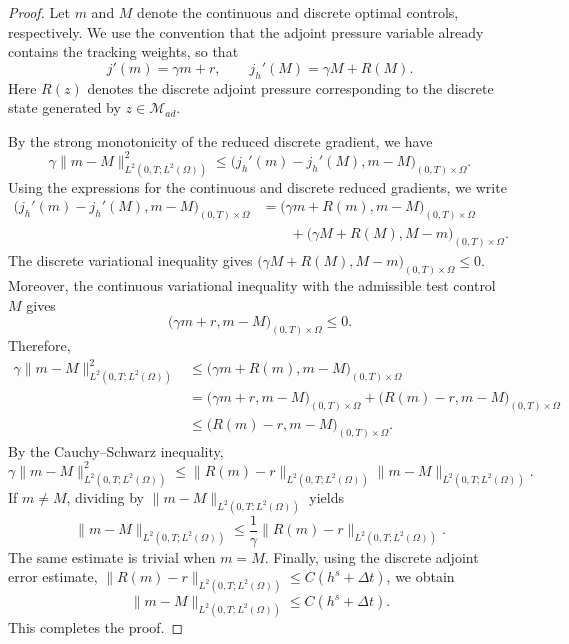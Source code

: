 \documentclass{amsart}
\begin{document}
\begin{proof}
Let $m$ and $M$ denote the continuous and discrete optimal controls,
respectively. We use the convention that the adjoint pressure variable
already contains the tracking weights, so that
\[
        j'(m)=\gamma m+r,
        \qquad
        j_h'(M)=\gamma M+R(M).
\]
Here $R(z)$ denotes the discrete adjoint pressure corresponding to the discrete state generated by $z \in \mathcal{M}_{ad}$.

By the strong monotonicity of the reduced discrete gradient, we have
\[
\gamma \|m-M\|_{L^2(0,T;L^2(\Omega))}^{2}
\le
\bigl(j_h'(m)-j_h'(M),m-M\bigr)_{(0,T) \times \Omega}.
\]
Using the expressions for the continuous and discrete reduced gradients,
we write
\[
\begin{aligned}
\bigl(j_h'(m)-j_h'(M),m-M\bigr)_{(0,T) \times \Omega}
& =
\bigl(\gamma m+R(m),m-M\bigr)_{(0,T) \times \Omega}
\\
&\qquad
+
\bigl(\gamma M+R(M),M-m\bigr)_{(0,T) \times \Omega}.
\end{aligned}
\]
The discrete variational inequality gives $\bigl(\gamma M+R(M),M-m\bigr)_{(0,T) \times \Omega}\le 0$. Moreover, the continuous variational inequality with the admissible test control $M$ gives
\[
\bigl(\gamma m+r,m-M\bigr)_{(0,T) \times \Omega}\le 0.
\]
Therefore,
\[
\begin{aligned}
\gamma \|m-M\|_{L^2(0,T;L^2(\Omega))}^{2}
&\le
\bigl(\gamma m+R(m),m-M\bigr)_{(0,T) \times \Omega}
\\
&=
\bigl(\gamma m+r,m-M\bigr)_{(0,T) \times \Omega}
+
\bigl(R(m)-r,m-M\bigr)_{(0,T) \times \Omega}
\\
&\le
\bigl(R(m)-r,m-M\bigr)_{(0,T) \times \Omega}.
\end{aligned}
\]
By the Cauchy--Schwarz inequality,
\[
\gamma \|m-M\|_{L^2(0,T;L^2(\Omega))}^{2}
\le
\|R(m)-r\|_{L^2(0,T;L^2(\Omega))}
\|m-M\|_{L^2(0,T;L^2(\Omega))}.
\]
If $m\neq M$, dividing by
$\|m-M\|_{L^2(0,T;L^2(\Omega))}$ yields
\[
\|m-M\|_{L^2(0,T;L^2(\Omega))}
\le
\frac{1}{\gamma}
\|R(m)-r\|_{L^2(0,T;L^2(\Omega))}.
\]
The same estimate is trivial when $m=M$. Finally, using the discrete
adjoint error estimate, $\|R(m)-r\|_{L^2(0,T;L^2(\Omega))}
\le C(h^s+\Delta t)$, 
we obtain
\[
\|m-M\|_{L^2(0,T;L^2(\Omega))}
\le C(h^s+\Delta t).
\]
This completes the proof.
\end{proof}
\end{document}
